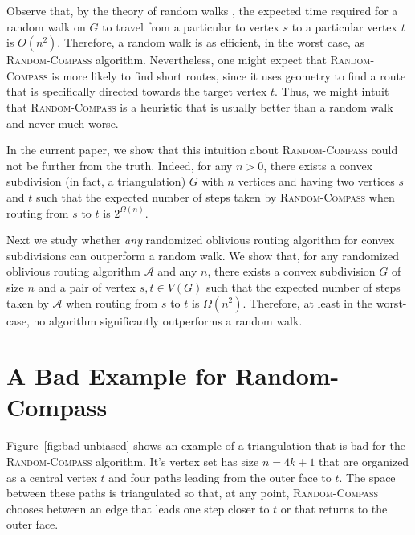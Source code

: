 \documentclass [letterpaper] {patmorin}
\begin{document}
Observe that, by the theory of random walks \cite{X}, the expected time required for a random walk on $G$ to travel from a particular to vertex $s$ to a particular vertex $t$ is $O(n^2)$.  Therefore, a random walk is as efficient, in the worst case, as \textsc{Random-Compass} algorithm. Nevertheless, one might expect that \textsc{Random-Compass} is more likely to find short routes, since it uses geometry to find a route that is specifically directed towards the target vertex $t$.  Thus, we might intuit that \textsc{Random-Compass} is a heuristic that is usually better than a random walk and never much worse.

In the current paper, we show that this intuition about \textsc{Random-Compass} could not be further from the truth.  Indeed, for any $n>0$, there exists a convex subdivision (in fact, a triangulation) $G$ with $n$ vertices and having two vertices $s$ and $t$ such that the expected number of steps taken by \textsc{Random-Compass} when routing from $s$ to $t$ is $2^{\Omega(n)}$.

Next we study whether \emph{any} randomized oblivious routing algorithm for convex subdivisions can outperform a random walk.  We show that, for any randomized oblivious routing algorithm $\mathcal{A}$ and any $n$, there exists a convex subdivision $G$ of size $n$ and a pair of vertex $s,t\in V(G)$ such that the expected number of steps taken by $\mathcal{A}$ when routing from $s$ to $t$ is $\Omega(n^2)$.  Therefore, at least in the worst-case, no algorithm significantly outperforms a random walk.

\section{A Bad Example for Random-Compass}

Figure~\ref{fig:bad-unbiased} shows an example of a triangulation that is
bad for the \textsc{Random-Compass} algorithm.  It's vertex set has size
$n=4k+1$ that are organized as a central vertex $t$ and four paths leading
from the outer face to $t$.  The space between these paths is triangulated
so that, at any point, \textsc{Random-Compass} chooses between an edge
that leads one step closer to $t$ or that returns to the outer face.
\end{document}
